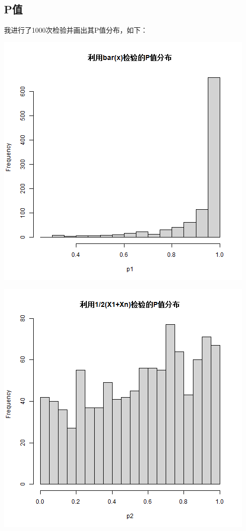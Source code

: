 \documentclass{article}
\begin{document}
\begin{CJK}{UTF8}{gbsn}
\subsection{P值}
我进行了1000次检验并画出其P值分布，如下：\\
\begin{minipage}{0.5\textwidth}
    \includegraphics[scale=0.5]{check1.png}
\end{minipage}
\begin{minipage}{0.5\textwidth}
    \includegraphics[scale=0.5]{check2.png}
\end{minipage}

\end{CJK}
\end{document}
